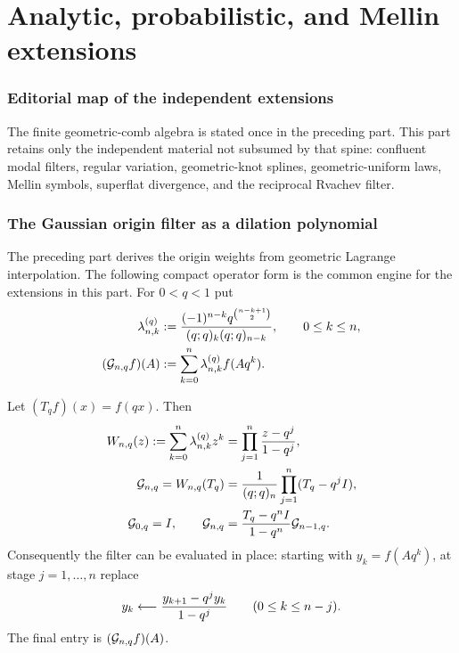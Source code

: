 \part{Analytic, probabilistic, and Mellin extensions}

\section*{Editorial map of the independent extensions}
The finite geometric-comb algebra is stated once in the preceding part. This part retains only the independent material not subsumed by that spine: confluent modal filters, regular variation, geometric-knot splines, geometric-uniform laws, Mellin symbols, superflat divergence, and the reciprocal Rvachev filter.

\section{The Gaussian origin filter as a dilation polynomial}
\label{g1:sec:operator}

The preceding part derives the origin weights from geometric Lagrange
interpolation.  The following compact operator form is the common engine for
the extensions in this part.  For $0<q<1$ put
\begin{align}
 \lambda_{n,k}^{(q)}
 &:={(-1)^{n-k}q^{\binom{n-k+1}{2}}
       \over (q;q)_k(q;q)_{n-k}},
 \qquad 0\le k\le n,
 \label{g1:eq:lambda}\\
 (\mathcal G_{n,q}f)(A)&:=\sum_{k=0}^n\lambda_{n,k}^{(q)}f(Aq^k).
 \label{g1:eq:G-definition}
\end{align}

\begin{theorem}
\label{g1:thm:operator-factorization}
Let $(T_qf)(x)=f(qx)$.  Then
\begin{align}
 W_{n,q}(z):=\sum_{k=0}^n\lambda_{n,k}^{(q)}z^k
 &=\prod_{j=1}^n{z-q^j\over1-q^j},
 \label{g1:eq:row-polynomial}\\
 \mathcal G_{n,q}=W_{n,q}(T_q)
 &={1\over(q;q)_n}\prod_{j=1}^n(T_q-q^jI),
 \label{g1:eq:operator-factorization}\\
 \mathcal G_{0,q}=I,
 \qquad
 \mathcal G_{n,q}&={T_q-q^nI\over1-q^n}\mathcal G_{n-1,q}.
 \label{g1:eq:operator-recursion}
\end{align}
Consequently the filter can be evaluated in place: starting with
$y_k=f(Aq^k)$, at stage $j=1,\ldots,n$ replace
\begin{equation}
 y_k\longleftarrow{y_{k+1}-q^jy_k\over1-q^j}
 \qquad(0\le k\le n-j).
 \label{g1:eq:triangular-filter}
\end{equation}
The final entry is $(\mathcal G_{n,q}f)(A)$.
\end{theorem}

